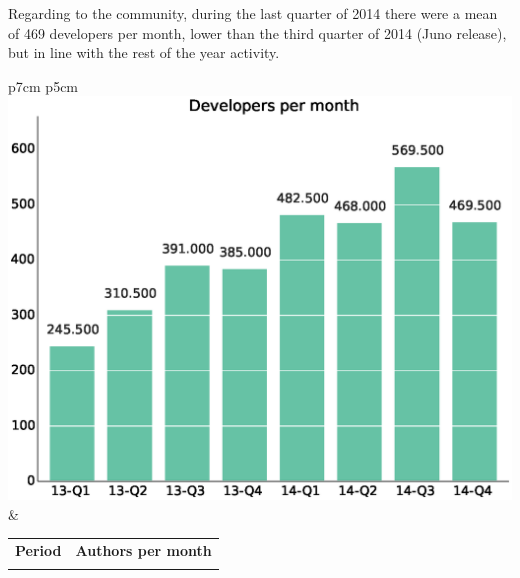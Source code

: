 \documentclass[a4wide,11pt]{report}
\begin{document}





Regarding to the community, during the last quarter of 2014 there were a mean of 469 developers per month, lower than the third quarter of 2014 (Juno release), but in line with the rest of the year activity.

\begin{tabular}{p{7cm} p{5cm}}
    \vspace{0pt} 
    \includegraphics[scale=.35]{figs/authors_month.eps}
    & 
    \vspace{0pt}
    \begin{tabular}{l|r|}%
    \bfseries Period & \bfseries Authors per month%
   \csvreader[head to column names]{data/authors_month.csv}{}%
   {\\ & \authormonth}
   \end{tabular}
\end{tabular}
\end{document}
